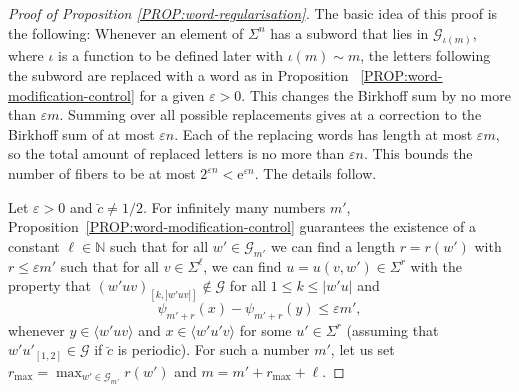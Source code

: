 \documentclass[11pt,reqno]{amsart}
\theoremstyle{plain}
\theoremstyle{definition}
\newcommand{\N}{{\mathbb N}}
\newcommand{\mc}{\mathcal}
\newcommand{\me}{\mathrm{e}}
\begin{document}
\begin{proof}[Proof of Proposition \ref{PROP:word-regularisation}]
The basic idea of this proof is the following: Whenever an element of $\Sigma^n$ has  a subword  that lies in $\mc G_{\iota(m)}$, where $\iota$ is a function to be defined later with $\iota(m)\sim m$,  the letters following the subword are replaced with a word as in  Proposition ~\ref{PROP:word-modification-control} for a given $\varepsilon>0$. This changes the Birkhoff sum by no more than $\varepsilon m$.
 Summing over all possible replacements gives at a correction  to the Birkhoff sum of at most $\varepsilon n$. Each of the replacing words has length at most $\varepsilon m$, so the total amount of replaced letters is no more than $\varepsilon n$. This bounds the number of fibers to be at most $2^{\varepsilon n}< \me^{\varepsilon n}$. The details follow.

Let $\varepsilon > 0$ and $\breve{c} \neq 1/2$. For infinitely many numbers $m'$, Proposition~\ref{PROP:word-modification-control} guarantees the existence of a constant $\ell \in \N$ such that for all $w' \in \mc G_{m'}$ we can find a length $r = r(w')$ with $r \leqslant \varepsilon m'$
such that for all $v \in \Sigma^\ell$, we can find $u = u(v,w') \in \Sigma^r$ with the property that $(w'uv)_{[k,|w'uv|]} \notin \mc G$ for all $1 \leqslant k \leqslant |w'u|$ and
\begin{equation}
\label{EQ:variation_estimate_after_modification}
\psi_{m'+r}(x) - \psi_{m'+r}(y) \leqslant \varepsilon m',
\end{equation}
whenever $y \in \langle w' u v\rangle$ and $x \in \langle w' u' v \rangle$ for some $u' \in \Sigma^r$ (assuming that $w'u'_{[1,2]} \in \mc G$ if $\breve{c}$ is periodic). 
For such a number $m'$, let us set $r_{\max} = \max_{w' \in \mc G_{m'}} r(w')$ and $m = m' + r_{\max} + \ell$.


\end{proof}
\end{document}
